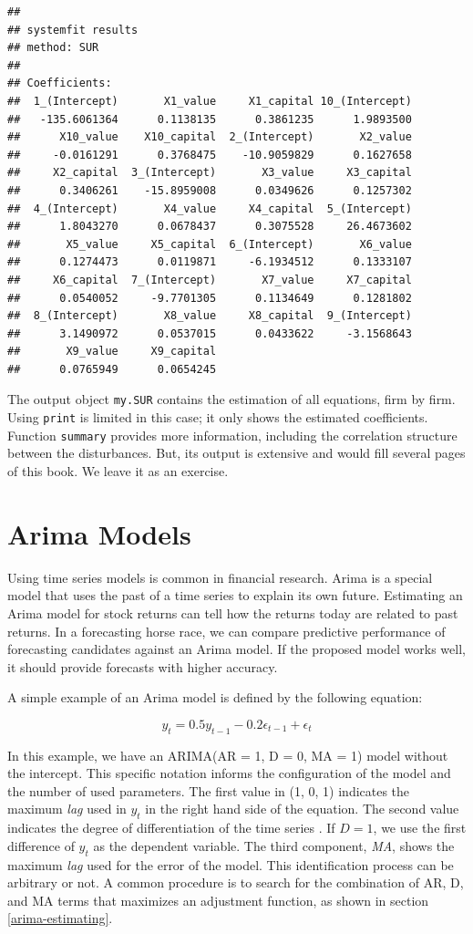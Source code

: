 \documentclass[11pt,]{book}
\begin{document}
\begin{verbatim}
## 
## systemfit results 
## method: SUR 
## 
## Coefficients:
##  1_(Intercept)       X1_value     X1_capital 10_(Intercept) 
##   -135.6061364      0.1138135      0.3861235      1.9893500 
##      X10_value    X10_capital  2_(Intercept)       X2_value 
##     -0.0161291      0.3768475    -10.9059829      0.1627658 
##     X2_capital  3_(Intercept)       X3_value     X3_capital 
##      0.3406261    -15.8959008      0.0349626      0.1257302 
##  4_(Intercept)       X4_value     X4_capital  5_(Intercept) 
##      1.8043270      0.0678437      0.3075528     26.4673602 
##       X5_value     X5_capital  6_(Intercept)       X6_value 
##      0.1274473      0.0119871     -6.1934512      0.1333107 
##     X6_capital  7_(Intercept)       X7_value     X7_capital 
##      0.0540052     -9.7701305      0.1134649      0.1281802 
##  8_(Intercept)       X8_value     X8_capital  9_(Intercept) 
##      3.1490972      0.0537015      0.0433622     -3.1568643 
##       X9_value     X9_capital 
##      0.0765949      0.0654245
\end{verbatim}

The output object \texttt{my.SUR} contains the estimation of all
equations, firm by firm. Using \texttt{print} is limited in this case;
it only shows the estimated coefficients. Function \texttt{summary}
provides more information, including the correlation structure between
the disturbances. But, its output is extensive and would fill several
pages of this book. We leave it as an exercise.

\section{Arima Models}\label{arima-models}

Using time series models is common in financial research. Arima is a
special model that uses the past of a time series to explain its own
future. Estimating an Arima model for stock returns can tell how the
returns today are related to past returns. In a forecasting horse race,
we can compare predictive performance of forecasting candidates against
an Arima model. If the proposed model works well, it should provide
forecasts with higher accuracy.

A simple example of an Arima model is defined by the following equation:

\[y _t = 0.5 y_{t-1} - 0.2 \epsilon _{t-1} + \epsilon _t\]

In this example, we have an ARIMA(AR = 1, D = 0, MA = 1) model without
the intercept. This specific notation informs the configuration of the
model and the number of used parameters. The first value in (1, 0, 1)
indicates the maximum \emph{lag} used in \(y_t\) in the right hand side
of the equation. The second value indicates the degree of
differentiation of the time series \citep{hamilton1994time}. If \(D=1\),
we use the first difference of \(y_t\) as the dependent variable. The
third component, \emph{MA}, shows the maximum \emph{lag} used for the
error of the model. This identification process can be arbitrary or not.
A common procedure is to search for the combination of AR, D, and MA
terms that maximizes an adjustment function, as shown in section
\ref{arima-estimating}.
\end{document}
